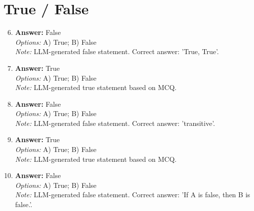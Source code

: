 \documentclass[12pt]{article}
\begin{document}
\section*{True / False}
\begin{enumerate}[label=\arabic*.]
\setcounter{enumi}{5}
\item \textbf{Answer:} False
\\ \textit{Options:} A) True; B) False
\\ \textit{Note:} LLM-generated false statement. Correct answer: 'True, True'.
\item \textbf{Answer:} True
\\ \textit{Options:} A) True; B) False
\\ \textit{Note:} LLM-generated true statement based on MCQ.
\item \textbf{Answer:} False
\\ \textit{Options:} A) True; B) False
\\ \textit{Note:} LLM-generated false statement. Correct answer: 'transitive'.
\item \textbf{Answer:} True
\\ \textit{Options:} A) True; B) False
\\ \textit{Note:} LLM-generated true statement based on MCQ.
\item \textbf{Answer:} False
\\ \textit{Options:} A) True; B) False
\\ \textit{Note:} LLM-generated false statement. Correct answer: 'If A is false, then B is false.'.
\end{enumerate}
\end{document}
